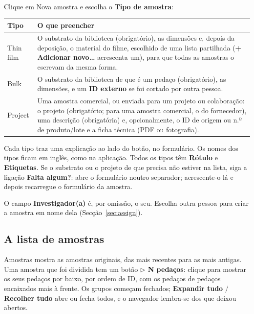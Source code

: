 \documentclass[11pt,a4paper]{article}
\newcommand{\ui}[1]{\textsf{\textbf{#1}}}
\newcommand{\menu}[1]{\textsf{#1}}
\begin{document}
Clique em \menu{Nova amostra} e escolha o \ui{Tipo de amostra}:

\begin{center}
\begin{tabularx}{\linewidth}{@{}lX@{}}
\toprule
\textbf{Tipo} & \textbf{O que preencher} \\
\midrule
Thin film     & O substrato da biblioteca (obrigatório), as dimensões e, depois
                da deposição, o material do filme, escolhido de uma lista
                partilhada (\ui{+ Adicionar novo…} acrescenta um), para que
                todas as amostras o escrevam da mesma forma. \\
Bulk          & O substrato da biblioteca de que é um pedaço (obrigatório), as
                dimensões, e um \ui{ID externo} se foi cortado por outra pessoa. \\
Project       & Uma amostra comercial, ou enviada para um projeto ou
                colaboração: o projeto (obrigatório; para uma amostra comercial,
                o do fornecedor), uma descrição (obrigatória) e, opcionalmente,
                o ID de origem ou n.º de produto/lote e a ficha técnica (PDF
                ou fotografia). \\
\bottomrule
\end{tabularx}
\end{center}

Cada tipo traz uma explicação ao lado do botão, no formulário. Os nomes dos tipos ficam em inglês, como na aplicação. Todos os tipos têm
\ui{Rótulo} e \ui{Etiquetas}. Se o substrato ou o projeto de que precisa
não estiver na lista, siga a ligação \ui{Falta algum?}: abre o formulário
noutro separador; acrescente-o lá e depois recarregue o formulário da
amostra.

O campo \ui{Investigador(a)} é, por omissão, o seu. Escolha outra pessoa
para criar a amostra em nome dela (Secção~\ref{sec:assign}).

\subsection{A lista de amostras}

\menu{Amostras} mostra as amostras originais, das mais recentes para as
mais antigas. Uma amostra que foi dividida tem um botão \ui{$\triangleright$ N
pedaços}: clique para mostrar os seus pedaços por baixo, por ordem de ID,
com os pedaços de pedaços encaixados mais à frente. Os grupos começam
fechados; \ui{Expandir tudo} / \ui{Recolher tudo} abre ou fecha todos, e o
navegador lembra-se dos que deixou abertos.
\end{document}
